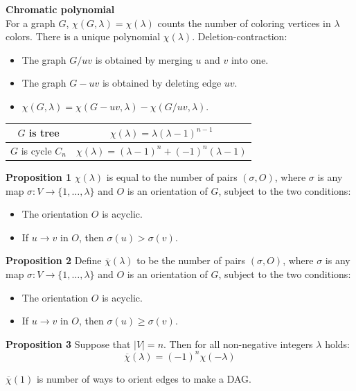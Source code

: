 \textbf{\large{Chromatic polynomial}}\\
For a graph $G$, $\chi(G, \lambda) = \chi(\lambda)$ counts the number of coloring vertices in $\lambda$ colors.
There is a unique polynomial $\chi(\lambda)$. Deletion-contraction:
\begin{itemize}
\item The graph $G/uv$ is obtained by merging $u$ and $v$ into one. 
\item The graph $G - uv$ is obtained by deleting edge $uv$.
\item $\chi(G, \lambda) = \chi(G - uv, \lambda) - \chi(G/uv, \lambda)$. 
\end{itemize}

\begin{tabular}{|c|c|}
\hline
$G$ is tree & $\chi(\lambda) = \lambda(\lambda - 1)^{n - 1}$ \\
\hline
$G$ is cycle $C_n$ & $\chi(\lambda) = (\lambda - 1)^n + (-1)^n(\lambda - 1)$\\
\hline
\end{tabular} 
 
\textbf{Proposition 1} $\chi(\lambda)$ is equal to the number of pairs $(\sigma, O)$, 
where $\sigma$ is any map $\sigma : V \rightarrow \{1, \dots, \lambda\}$ and $O$ is an orientation of $G$, 
subject to the two conditions:
\begin{itemize}
\item The orientation $O$ is acyclic.
\item If $u \rightarrow v$ in $O$, then $\sigma (u) > \sigma (v)$.
\end{itemize}

\textbf{Proposition 2} Define $\overline{\chi}(\lambda)$ to be the number of pairs $(\sigma, O)$, 
where $\sigma$ is any map $\sigma : V \rightarrow \{1, \dots, \lambda\}$ and $O$ is an orientation of $G$, 
subject to the two conditions:
\begin{itemize}
\item The orientation $O$ is acyclic.
\item If $u \rightarrow v$ in $O$, then $\sigma (u) \ge \sigma (v)$.
\end{itemize}

\textbf{Proposition 3} Suppose that $|V| = n$. Then for all non-negative integers $\lambda$ holds:
$$\overline{\chi}(\lambda) = (-1)^n \chi(-\lambda)$$


$\overline{\chi}(1)$ is number of ways to orient edges to make a DAG.
